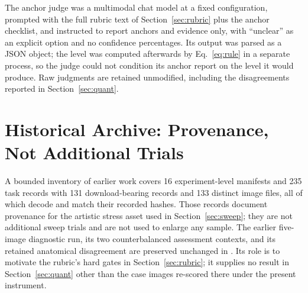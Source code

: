 \documentclass[11pt]{article}
\begin{document}
The anchor judge was a multimodal chat model at a fixed configuration, prompted with the full rubric text of Section~\ref{sec:rubric} plus the anchor checklist, and instructed to report anchors and evidence only, with ``unclear'' as an explicit option and no confidence percentages. Its output was parsed as a JSON object; the level was computed afterwards by Eq.~\ref{eq:rule} in a separate process, so the judge could not condition its anchor report on the level it would produce. Raw judgments are retained unmodified, including the disagreements reported in Section~\ref{sec:quant}.

\section{Historical Archive: Provenance, Not Additional Trials}
A bounded inventory of earlier work covers 16 experiment-level manifests and 235 task records with 131 download-bearing records and 133 distinct image files, all of which decode and match their recorded hashes. Those records document provenance for the artistic stress asset used in Section~\ref{sec:sweep}; they are not additional sweep trials and are not used to enlarge any sample. The earlier five-image diagnostic run, its two counterbalanced assessment contexts, and its retained anatomical disagreement are preserved unchanged in . Its role is to motivate the rubric's hard gates in Section~\ref{sec:rubric}; it supplies no result in Section~\ref{sec:quant} other than the case images re-scored there under the present instrument.


\end{document}
